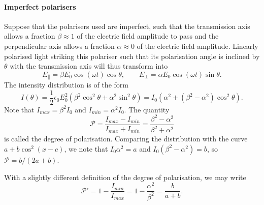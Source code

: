 \documentclass[11pt]{article}
\begin{document}
        \paragraph{Imperfect polarisers}
        Suppose that the polarisers used are imperfect, such that the transmission axis allows a fraction $\beta \approx 1$ of the electric field
        amplitude to pass and the perpendicular axis allows a fraction $\alpha \approx 0$ of the electric field amplitude.
        Linearly polarised light striking this polariser such that its polarisation angle is inclined by $\theta$ with the transmission axis
        will thus transform into
        \[
                E_\parallel = \beta E_0\cos(\omega t)\cos\theta, \qquad E_\perp = \alpha E_0\cos(\omega t)\sin\theta.
        \]
        The intensity distribution is of the form
        \[
                I(\theta) = \frac{1}{2}\epsilon_0E_0^2(\beta^2\cos^2\theta + \alpha^2\sin^2\theta) = I_0 (\alpha^2 + (\beta^2 - \alpha^2)\cos^2\theta).
        \]
        Note that $I_{max} = \beta^2I_0$ and $I_{min} = \alpha^2 I_0$. The quantity
        \[
                \mathcal{P} = \frac{I_{max} - I_{min}}{I_{max} + I_{min}} = \frac{\beta^2 - \alpha^2}{\beta^2 + \alpha^2}
        \]
        is called the degree of polarisation. Comparing the distribution with the curve $a + b\cos^2(x - c)$, we note that
        $I_0\alpha^2 = a$ and $I_0(\beta^2 - \alpha^2) = b$, so $\mathcal{P} = b / (2a + b)$.

        With a slightly different definition of the degree of polarisation, we may write
        \[
                \mathcal{P}' = 1 - \frac{I_{min}}{I_{max}} = 1 - \frac{\alpha^2}{\beta^2} = \frac{b}{a + b}.
        \]
\end{document}

